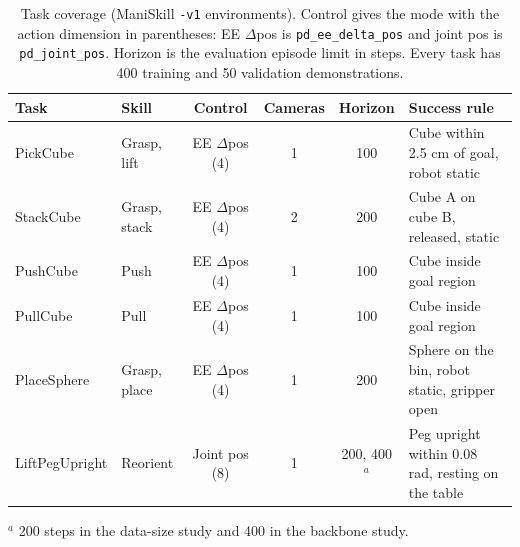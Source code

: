\begin{table}[htbp]
  \centering
  \caption{Task coverage (ManiSkill \texttt{-v1} environments). Control gives
  the mode with the action dimension in parentheses: EE $\Delta$pos is
  \texttt{pd\_ee\_delta\_pos} and joint pos is \texttt{pd\_joint\_pos}.
  Horizon is the evaluation episode limit in steps. Every task has 400
  training and 50 validation demonstrations.}
  \label{tab:tasks}
  \small
  \setlength{\tabcolsep}{4pt}
  \begin{tabularx}{\linewidth}{@{}llccc>{\raggedright\arraybackslash}X@{}}
    \toprule
    Task & Skill & Control & Cameras & Horizon & Success rule \\
    \midrule
    PickCube & Grasp, lift & EE $\Delta$pos (4) & 1 & 100 & Cube within 2.5 cm of goal, robot static \\
    StackCube & Grasp, stack & EE $\Delta$pos (4) & 2 & 200 & Cube A on cube B, released, static \\
    PushCube & Push & EE $\Delta$pos (4) & 1 & 100 & Cube inside goal region \\
    PullCube & Pull & EE $\Delta$pos (4) & 1 & 100 & Cube inside goal region \\
    PlaceSphere & Grasp, place & EE $\Delta$pos (4) & 1 & 200 & Sphere on the bin, robot static, gripper open \\
    LiftPegUpright & Reorient & Joint pos (8) & 1 & 200, 400$^{a}$ & Peg upright within 0.08 rad, resting on the table \\
    \bottomrule
  \end{tabularx}

  \vspace{2pt}
  \parbox{\linewidth}{\footnotesize
  $^{a}$ 200 steps in the data-size study and 400 in the backbone study.}
\end{table}
